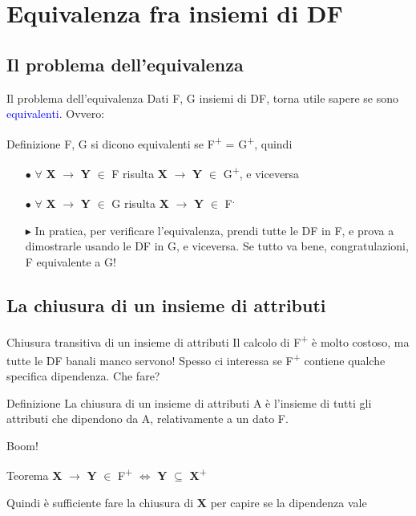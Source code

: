 \documentclass{beamer}
\begin{document}
\section{Equivalenza fra insiemi di DF}
\subsection{Il problema dell'equivalenza}
\begin{frame}{Il problema dell'equivalenza}
    Dati F, G insiemi di DF, torna utile sapere se sono \textcolor{blue}{equivalenti}. Ovvero:
    \begin{block}{Definizione}
        F, G si dicono equivalenti se F\textsuperscript{+} = G\textsuperscript{+}, quindi 
        
        \begin{itemize}
            \item[$\bullet$] $\forall$ \textbf{X} $\rightarrow$ \textbf{Y} $\in$ F risulta \textbf{X} $\rightarrow$ \textbf{Y} $\in$ G\textsuperscript{+}, e viceversa
            \item[$\bullet$] $\forall$ \textbf{X} $\rightarrow$ \textbf{Y} $\in$ G risulta \textbf{X} $\rightarrow$ \textbf{Y} $\in$ F\textsuperscript.
        \end{itemize}
        
    \end{block}
    
    \vfill
    \begin{itemize}
        \item[$\blacktriangleright$] In pratica, per verificare l'equivalenza, prendi tutte le DF in F, e prova a dimostrarle usando le DF in G, e viceversa. Se tutto va bene, congratulazioni, F equivalente a G!
    \end{itemize}
\end{frame}


\subsection{La chiusura di un insieme di attributi}
\begin{frame}{Chiusura transitiva di un insieme di attributi}
    Il calcolo di F\textsuperscript{+} è molto costoso, ma tutte le DF banali manco servono! Spesso ci interessa se F\textsuperscript{+} contiene qualche specifica dipendenza. Che fare?
    \begin{block}{Definizione}
    La chiusura di un insieme di attributi A è l'insieme di tutti gli attributi che dipendono da A, relativamente a un dato F.
    \end{block}
    
    \vfill
    Boom!
    \begin{alertblock}{Teorema}
        \centering
        \textbf{X} $\rightarrow$ \textbf{Y} $\in$ F\textsuperscript{+} $\iff$ \textbf{Y} $\subseteq$ \textbf{X}\textsuperscript{+}
    \end{alertblock}
    Quindi è sufficiente fare la chiusura di \textbf{X} per capire se la dipendenza vale
\end{frame}
\end{document}
